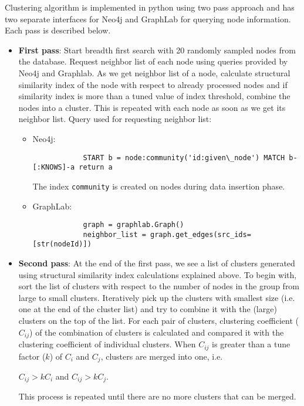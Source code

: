 Clustering algorithm is implemented in python using two pass approach and has two separate interfaces for Neo4j \cite{neo4j} and GraphLab \cite{graphlab} for querying node information. Each pass is described below.
\begin{itemize}
	\item
	\textbf{First pass}: Start breadth first search with 20 randomly sampled nodes from the database. Request neighbor list of each node using queries provided by Neo4j and Graphlab. As we get neighbor list of a node, calculate structural similarity index of the node with respect to already processed nodes and if similarity index is more than a tuned value of index threshold, combine the nodes into a cluster. This is repeated with each node as soon as we get its neighbor list. Query used for requesting neighbor list:
		\begin{itemize}
			\item
			Neo4j:
			\begin{verbatim}
			START b = node:community('id:given\_node') MATCH b-[:KNOWS]-a return a
			\end{verbatim}
			The index \texttt{community} is created on nodes during data insertion phase.
			\item
			GraphLab: 
			\begin{verbatim}
			graph = graphlab.Graph()
			neighbor_list = graph.get_edges(src_ids=[str(nodeId)])
			\end{verbatim}
		\end{itemize}
	\item
	\textbf{Second pass}: At the end of the first pass, we see a list of clusters generated using structural similarity index calculations explained above. To begin with, sort the list of clusters with respect to the number of nodes in the group from large to small clusters. Iteratively pick up the clusters with smallest size (i.e. one at the end of the cluster list) and try to combine it with the (large) clusters on the top of the list. For each pair of clusters, clustering coefficient ($ C_{ij} $) of the combination of clusters is calculated and compared it with the clustering coefficient of individual clusters. When $ C_{ij} $ is greater than a tune factor ($ k $) of $ C_i $ and $ C_j $, clusters are merged into one, i.e. 
	\begin{center}
		$ C_{ij} > kC_i$ and $C_{ij} > kC_j $.
	\end{center} 
	This process is repeated until there are no more clusters that can be merged.
\end{itemize}
